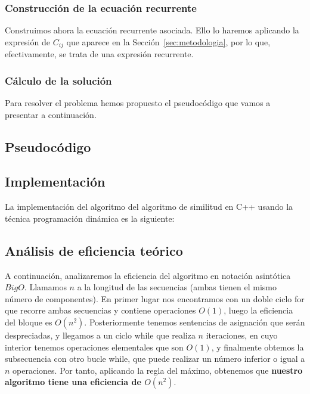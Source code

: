 \subsubsection{Construcción de la ecuación recurrente}

Construimos ahora la ecuación recurrente asociada. Ello lo haremos aplicando
la expresión de $C_{ij}$ que aparece en la Sección~\ref{sec:metodologia}, por lo
que, efectivamente, se trata de una expresión recurrente. 

\subsubsection{Cálculo de la solución}

Para resolver el problema hemos propuesto el pseudocódigo que vamos a presentar
a continuación. 

\subsection{Pseudocódigo}

\subsection{Implementación}

La implementación del algoritmo del algoritmo de similitud en C++ usando la técnica programación dinámica es la siguiente:





\subsection{Análisis de eficiencia teórico}

A continuación, analizaremos la eficiencia del algoritmo en notación asintótica $BigO$.
Llamamos $n$ a la longitud de las secuencias (ambas tienen el mismo número de componentes). En primer lugar nos encontramos con un doble ciclo for que recorre ambas
secuencias y contiene operaciones $O(1)$, luego la eficiencia del bloque es $O(n^{2})$.
Posteriormente tenemos sentencias de asignación que serán despreciadas, y llegamos a un
ciclo while que realiza $n$ iteraciones, en cuyo interior tenemos operaciones elementales que son $O(1)$, y finalmente obtemos la subsecuencia con otro bucle while, que puede realizar un número inferior o igual a $n$ operaciones. Por tanto, aplicando la regla del máximo, obtenemos que \textbf{nuestro algoritmo tiene una eficiencia de $O(n^{2})$}.
 

